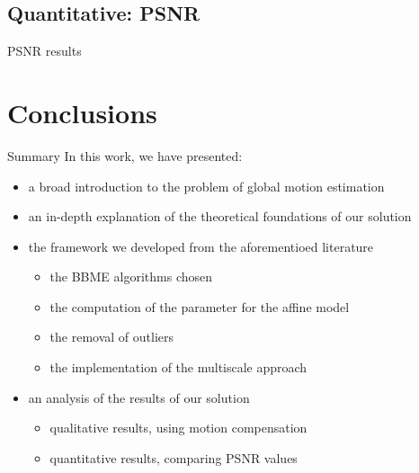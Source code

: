 \documentclass[aspectratio=1610,xcolor=dvipsnames]{beamer}
\begin{document}
\subsection{Quantitative: PSNR}
\begin{frame}{PSNR results}
    \begin{table}
        \label{tab:psnr}
        
        \caption{PSNR result on a some example video sequences}
    \end{table}    
\end{frame}


\section{Conclusions}
\begin{frame}
    \begin{block}{Summary}
        In this work, we have presented:
        \begin{itemize}
            \item a broad introduction to the problem of global motion estimation
            \item an in-depth explanation of the theoretical foundations of our solution
            \item the framework we developed from the aforementioed literature
            \begin{itemize}
                \item the BBME algorithms chosen
                \item the computation of the parameter for the affine model
                \item the removal of outliers
                \item the implementation of the multiscale approach
            \end{itemize}
            \item an analysis of the results of our solution
            \begin{itemize}
                \item qualitative results, using motion compensation
                \item quantitative results, comparing PSNR values
            \end{itemize} 
        \end{itemize}        
    \end{block}
\end{frame}
\end{document}
